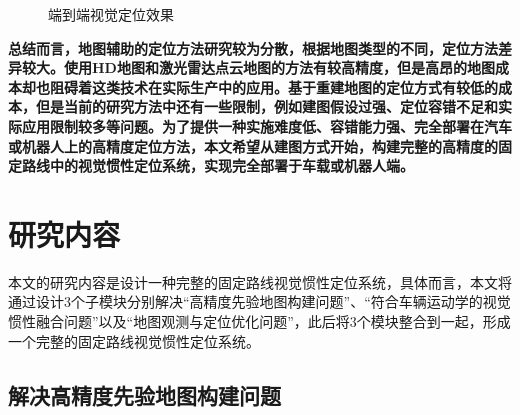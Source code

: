 \begin{figure}
  \centering
  \caption{端到端视觉定位效果}
  \label{fig:e2eloc}
\end{figure}

\textbf{总结而言，地图辅助的定位方法研究较为分散，根据地图类型的不同，定位方法差异较大。使用HD地图和激光雷达点云地图的方法有较高精度，但是高昂的地图成本却也阻碍着这类技术在实际生产中的应用。基于重建地图的定位方式有较低的成本，但是当前的研究方法中还有一些限制，例如建图假设过强、定位容错不足和实际应用限制较多等问题。为了提供一种实施难度低、容错能力强、完全部署在汽车或机器人上的高精度定位方法，本文希望从建图方式开始，构建完整的高精度的固定路线中的视觉惯性定位系统，实现完全部署于车载或机器人端。}






\section{研究内容}

本文的研究内容是设计一种完整的固定路线视觉惯性定位系统，具体而言，本文将通过设计3个子模块分别解决“高精度先验地图构建问题”、“符合车辆运动学的视觉惯性融合问题”以及“地图观测与定位优化问题”，此后将3个模块整合到一起，形成一个完整的固定路线视觉惯性定位系统。

\subsection{解决高精度先验地图构建问题}

